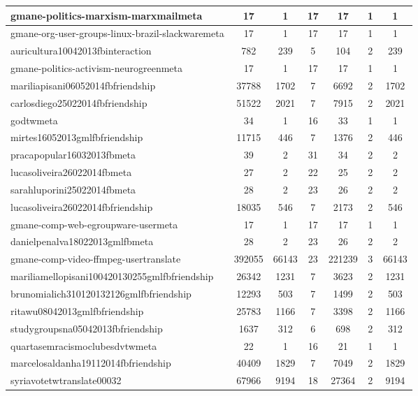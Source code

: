 \begin{table*}[h!]
\begin{center}
\begin{tabular}{| l | c | c | c | c | c | c |}
gmane-politics-marxism-marxmailmeta & 17  & 1  & 17  & 17  & 1  & 1 \\\hline
gmane-org-user-groups-linux-brazil-slackwaremeta & 17  & 1  & 17  & 17  & 1  & 1 \\\hline
auricultura10042013fbinteraction & 782  & 239  & 5  & 104  & 2  & 239 \\\hline
gmane-politics-activism-neurogreenmeta & 17  & 1  & 17  & 17  & 1  & 1 \\\hline
mariliapisani06052014fbfriendship & 37788  & 1702  & 7  & 6692  & 2  & 1702 \\\hline
carlosdiego25022014fbfriendship & 51522  & 2021  & 7  & 7915  & 2  & 2021 \\\hline
godtwmeta & 34  & 1  & 16  & 33  & 1  & 1 \\\hline
mirtes16052013gmlfbfriendship & 11715  & 446  & 7  & 1376  & 2  & 446 \\\hline
pracapopular16032013fbmeta & 39  & 2  & 31  & 34  & 2  & 2 \\\hline
lucasoliveira26022014fbmeta & 27  & 2  & 22  & 25  & 2  & 2 \\\hline
sarahluporini25022014fbmeta & 28  & 2  & 23  & 26  & 2  & 2 \\\hline
lucasoliveira26022014fbfriendship & 18035  & 546  & 7  & 2173  & 2  & 546 \\\hline
gmane-comp-web-egroupware-usermeta & 17  & 1  & 17  & 17  & 1  & 1 \\\hline
danielpenalva18022013gmlfbmeta & 28  & 2  & 23  & 26  & 2  & 2 \\\hline
gmane-comp-video-ffmpeg-usertranslate & 392055  & 66143  & 23  & 221239  & 3  & 66143 \\\hline
mariliamellopisani100420130255gmlfbfriendship & 26342  & 1231  & 7  & 3623  & 2  & 1231 \\\hline
brunomialich310120132126gmlfbfriendship & 12293  & 503  & 7  & 1499  & 2  & 503 \\\hline
ritawu08042013gmlfbfriendship & 25783  & 1166  & 7  & 3398  & 2  & 1166 \\\hline
studygroupsna05042013fbfriendship & 1637  & 312  & 6  & 698  & 2  & 312 \\\hline
quartasemracismoclubesdvtwmeta & 22  & 1  & 16  & 21  & 1  & 1 \\\hline
marcelosaldanha19112014fbfriendship & 40409  & 1829  & 7  & 7049  & 2  & 1829 \\\hline
syriavotetwtranslate00032 & 67966  & 9194  & 18  & 27364  & 2  & 9194 \\\hline

\end{tabular}
\end{center}
\end{table*}
